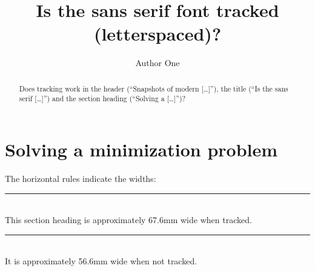 \documentclass{snapshotmfo}
\author{Author One}
\title{Is the sans serif font tracked (letterspaced)?}
\begin{document}
\begin{abstract}
\texorpdfstring{Does tracking work in the header (``Snapshots of modern [\dots]''), the title (``Is the sans serif [\dots]'') and the section heading (``Solving a [\dots]'')?
}{Does tracking work in the header ("Snapshots of modern [...]"), the title ("Is the sans serif [...]") and the section heading ("Solving a [...]")?
}
\end{abstract}

\section{Solving a minimization problem}
The horizontal rules indicate the widths: \\
\rule{67.6mm}{2mm} \\
This section heading is approximately 67.6mm wide when tracked. \\
\rule{56.6mm}{2mm} \\
It is approximately 56.6mm wide when not tracked.
\end{document}
